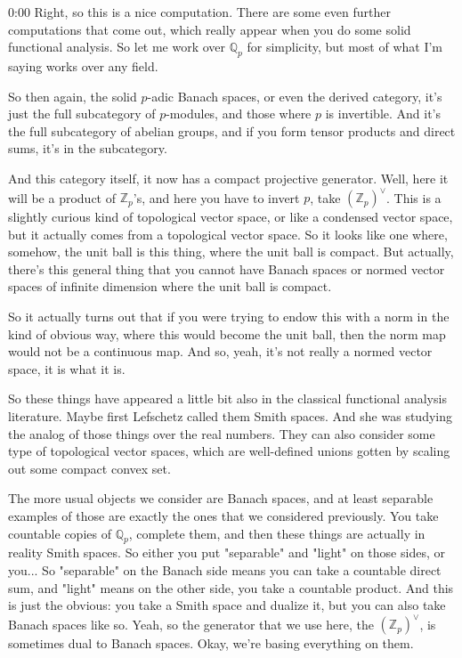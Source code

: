 \begin{unfinished}{0:00}
Right, so this is a nice computation. There are some even further computations that come out, which really appear when you do some solid functional analysis. So let me work over $\mathbb{Q}_p$ for simplicity, but most of what I'm saying works over any field.

So then again, the solid $p$-adic Banach spaces, or even the derived category, it's just the full subcategory of $p$-modules, and those where $p$ is invertible. And it's the full subcategory of abelian groups, and if you form tensor products and direct sums, it's in the subcategory.

And this category itself, it now has a compact projective generator. Well, here it will be a product of $\mathbb{Z}_p$'s, and here you have to invert $p$, take $(\mathbb{Z}_p)^\vee$. This is a slightly curious kind of topological vector space, or like a condensed vector space, but it actually comes from a topological vector space. So it looks like one where, somehow, the unit ball is this thing, where the unit ball is compact. But actually, there's this general thing that you cannot have Banach spaces or normed vector spaces of infinite dimension where the unit ball is compact.

So it actually turns out that if you were trying to endow this with a norm in the kind of obvious way, where this would become the unit ball, then the norm map would not be a continuous map. And so, yeah, it's not really a normed vector space, it is what it is.

So these things have appeared a little bit also in the classical functional analysis literature. Maybe first Lefschetz called them Smith spaces. And she was studying the analog of those things over the real numbers. They can also consider some type of topological vector spaces, which are well-defined unions gotten by scaling out some compact convex set.

The more usual objects we consider are Banach spaces, and at least separable examples of those are exactly the ones that we considered previously. You take countable copies of $\mathbb{Q}_p$, complete them, and then these things are actually in reality Smith spaces. So either you put "separable" and "light" on those sides, or you... So "separable" on the Banach side means you can take a countable direct sum, and "light" means on the other side, you take a countable product. And this is just the obvious: you take a Smith space and dualize it, but you can also take Banach spaces like so. Yeah, so the generator that we use here, the $(\mathbb{Z}_p)^\vee$, is sometimes dual to Banach spaces. Okay, we're basing everything on them.


\end{unfinished}
